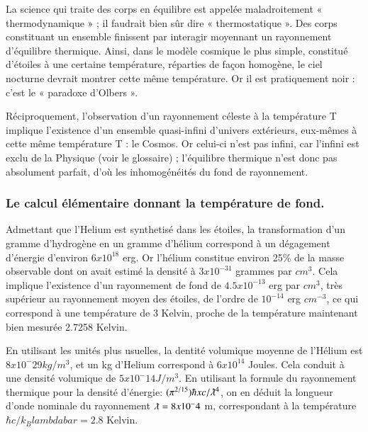 \documentclass[a4paper,12pt]{article}
\begin{document}
      La science qui traite des corps en équilibre est appelée maladroitement « thermodynamique » ; il faudrait bien sûr dire « thermostatique ». Des corps constituant un ensemble finissent par interagir moyennant un rayonnement d'équilibre thermique. 
Ainsi, dans le modèle cosmique le plus simple, constitué d'étoiles à une certaine température, réparties de façon homogène, le ciel nocturne devrait montrer cette même température. Or il est pratiquement noir : c'est le « paradoxe d'Olbers ».



Réciproquement, l'observation d'un rayonnement céleste à la température T implique l'existence d'un ensemble quasi-infini d'univers extérieurs, eux-mêmes à cette même température T : le Cosmos. Or celui-ci n'est pas infini, car l'infini est exclu de la Physique (voir le glossaire) ; l'équilibre thermique n'est donc pas absolument parfait, d'où les inhomogénéités du fond de rayonnement.








\subsubsection{Le calcul élémentaire donnant la température de fond.}

Admettant que l'Helium est synthetisé dans les étoiles, la transformation d'un gramme d'hydrogène en un gramme d'hélium correspond à un dégagement d'énergie d'environ $6 x 10^{18}$ erg. Or l'hélium  constitue environ 25\% de la masse observable dont on avait estimé la densité à $3 x 10^{-31}$ grammes par $cm^3$. Cela implique l'existence d'un rayonnement de fond de $4.5 x 10^{-13}$ erg par $cm^3$,  très supérieur au rayonnement moyen des étoiles, de l'ordre de $10^{-14}$ erg $cm^{-3}$, ce qui correspond à une température de 3 Kelvin, proche de la température maintenant bien mesurée  2.7258   Kelvin.

En utilisant les unités plus usuelles, la dentité volumique moyenne de l'Hélium est $8 x 10^-29 kg/m^3$, et un kg d'Helium correspond à $6 x 10^{14}$ Joules. Cela conduit à une densité volumique de $5x 10^-14 J/m^3$. En utilisant la formule du rayonnement thermique pour la densité d'énergie: $(\pi^{2/15}) \hbar x c/\lambdabar^4$, on en déduit la longueur d'onde nominale du rayonnement $\lambdabar = 8x 10^-4$ m, correspondant à la température $\hbar c/k_ B lambdabar = 2.8$ Kelvin.
\end{document}
